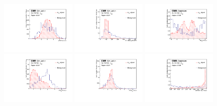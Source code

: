 \begin{figure}[htbp]
	\centering
	\includegraphics[width=0.32\textwidth]{6_Search/Figures/PlotsTechnics/SMtopetaZutsingletopuuu_norm}
	\includegraphics[width=0.32\textwidth]{6_Search/Figures/PlotsTechnics/mlbZutsingletopuuu_norm}
	\includegraphics[width=0.32\textwidth]{6_Search/Figures/PlotsTechnics/dPhiWlepbZutsingletopuuu_norm}
	\includegraphics[width=0.32\textwidth]{6_Search/Figures/PlotsTechnics/dRWlepbZutsingletopuuu_norm}
		\includegraphics[width=0.32\textwidth]{6_Search/Figures/PlotsTechnics/dRZWlepZutsingletopuuu_norm}
	\includegraphics[width=0.32\textwidth]{6_Search/Figures/PlotsTechnics/bdiscCSVv2_jet_0Zutsingletopuuu_norm}

\end{figure}
